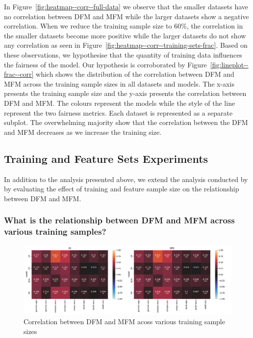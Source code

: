 \documentclass{article}
\begin{document}
In Figure \ref{fig:heatmap--corr--full-data} we observe that the
smaller datasets have no correlation between DFM and MFM while the
larger datasets show a negative correlation. When we reduce the
training sample size to 60\%, the correlation in the smaller datasets
become more positive while the larger datasets do not show any
correlation as seen in
Figure \ref{fig:heatmap--corr--training-sets-frac}. Based on these
observations, we hypothesise that the quantity of training data
influences the fairness of the model. Our hypothesis is corroborated
by Figure \ref{fig:lineplot--frac--corr} which shows the distribution
of the correlation between DFM and MFM across the training sample
sizes in all datasets and models. The x-axis presents the training
sample size and the y-axis presents the correlation between DFM and
MFM. The colours represent the models while the style of the line
represent the two fairness metrics. Each dataset is represented as
a separate subplot. The overwhelming majority show that the
correlation between the DFM and MFM decreases as we increase the
training size.

\subsection{Training and Feature Sets
  Experiments}\label{sec:results-training-feature-sets}
In addition to the analysis presented above, we extend the analysis
conducted by \citeauthor{zhang2021ignorance} by evaluating the effect
of training and feature sample size on the relationship between DFM
and MFM.

\subsubsection{What is the relationship between DFM and MFM across
  various training samples?}\label{sec:results-training-sets}

\begin{figure}
  \centering
  \includegraphics[width=0.95\linewidth]{heatmap--corr--frac.pdf}
  \caption{Correlation between DFM and MFM acoss various training
    sample sizes}
  \label{fig:heatmap--corr--frac}
\end{figure}
\end{document}
